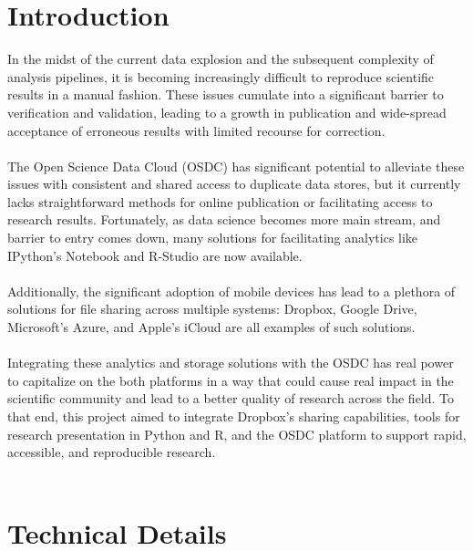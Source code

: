 \documentclass[10pt,a4]{article}
\begin{document}
\maketitle

\section{Introduction}
In the midst of the current data explosion and the subsequent complexity of analysis pipelines, it is becoming increasingly difficult to reproduce scientific results in a manual fashion.
These issues cumulate into a significant barrier to verification and validation, leading to a growth in publication and wide-spread acceptance of erroneous results with limited recourse for correction. \\ \\
The Open Science Data Cloud (OSDC) has significant potential to alleviate these issues with consistent and shared access to duplicate data stores, but it currently lacks straightforward methods for online publication or facilitating access to research results.
Fortunately, as data science becomes more main stream, and barrier to entry comes down, many solutions for facilitating analytics like IPython's Notebook and R-Studio are now available. \\ \\
Additionally, the significant adoption of mobile devices has lead to a plethora of solutions for file sharing across multiple systems: Dropbox, Google Drive, Microsoft's Azure, and Apple's iCloud are all examples of such solutions. \\ \\
Integrating these analytics and storage solutions with the OSDC has real power to capitalize on the  both platforms in a way that could cause real impact in the scientific community and lead to a better quality of research across the field.
To that end, this project aimed to integrate Dropbox's sharing capabilities, tools for research presentation in Python and R, and the OSDC platform to support rapid, accessible, and reproducible research. \\ \\

\section{Technical Details}
\end{document}
